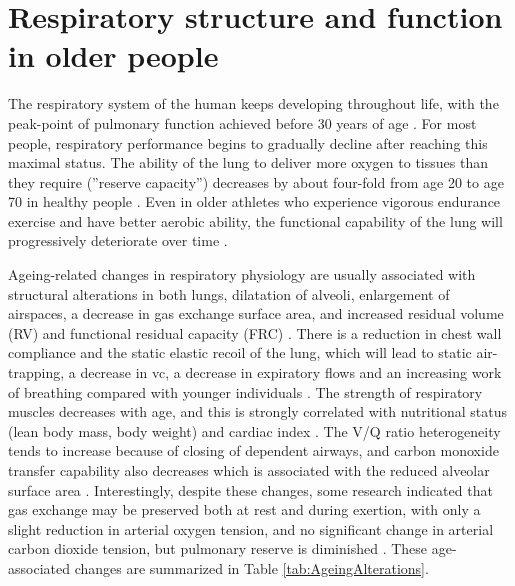\section{Respiratory structure and function in older people} \label{OlderRespiratory}
The respiratory system of the human keeps developing throughout life, with the peak-point of pulmonary function achieved before 30 years of age \citep{janssens1999physiological,sprung2006age}. For most people, respiratory performance begins to gradually decline after reaching this maximal status. The ability of the lung to deliver more oxygen to tissues than they require (''reserve capacity'') decreases by about four-fold from age 20 to age 70 in healthy people \citep{smith1986respiratory,zaugg2000respiratory}. Even in older athletes who experience vigorous endurance exercise and have better aerobic ability, the functional capability of the lung will progressively deteriorate over time \citep{mittman1965relationship, pollock1997twenty, mcclaran1995longitudinal}. 

Ageing-related changes in respiratory physiology are usually associated with structural alterations in both lungs, dilatation of alveoli, enlargement of airspaces, a decrease in gas exchange surface area, and increased residual volume (RV) and functional residual capacity (FRC) \citep{sprung2006age,lalley2013aging}. There is a reduction in chest wall compliance and the static elastic recoil of the lung, which will lead to static air-trapping, a decrease in \gls{vc}, a decrease in expiratory flows and an increasing work of breathing compared with younger individuals \citep{sprung2006age}. The strength of respiratory muscles decreases with age, and this is strongly correlated with nutritional status (lean body mass, body weight) and cardiac index \citep{janssens1999physiological}. The V/Q ratio heterogeneity tends to increase because of closing of dependent airways, and carbon monoxide transfer capability also decreases which is associated with the reduced alveolar surface area \citep{janssens1999physiological}. Interestingly, despite these changes, some research indicated that gas exchange may be preserved both at rest and during exertion, with only a slight reduction in arterial oxygen tension, and no significant change in arterial carbon dioxide tension, but pulmonary reserve is diminished \citep{janssens1999physiological, sprung2006age}. These age-associated changes are summarized in Table \ref{tab:AgeingAlterations}.

